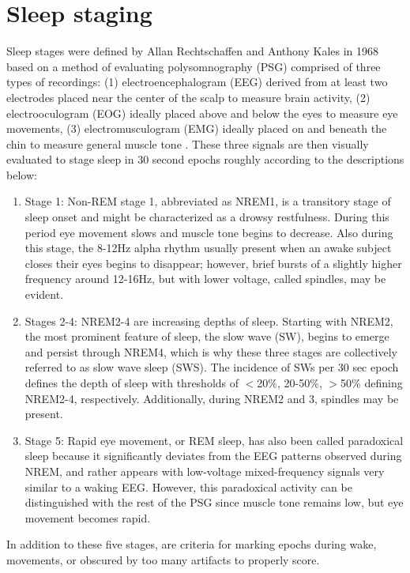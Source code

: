 \section*{Sleep staging}
Sleep stages were defined by Allan Rechtschaffen and Anthony Kales in 1968 based on a method of evaluating polysomnography (PSG) comprised of three types of recordings: (1) electroencephalogram (EEG) derived from at least two electrodes placed near the center of the scalp to measure brain activity, (2) electrooculogram (EOG) ideally placed above and below the eyes to measure eye movements, (3) electromusculogram (EMG) ideally placed on and beneath the chin to measure general muscle tone \cite{Kales1968}. These three signals are then visually evaluated to stage sleep in 30 second epochs roughly according to the descriptions below:
\begin{enumerate}
\item[] Stage 1: Non-REM stage 1, abbreviated as NREM1, is a transitory stage of sleep onset and might be characterized as a drowsy restfulness. During this period eye movement slows and muscle tone begins to decrease. Also during this stage, the 8-12Hz alpha rhythm usually present when an awake subject closes their eyes begins to disappear; however, brief bursts of a slightly higher frequency around 12-16Hz, but with lower voltage, called spindles, may be evident.
\item[] Stages 2-4: NREM2-4 are increasing depths of sleep. Starting with NREM2, the most prominent feature of sleep, the slow wave (SW), begins to emerge and persist through NREM4, which is why these three stages are collectively referred to as slow wave sleep (SWS). The incidence of SWs per 30 sec epoch defines the depth of sleep with thresholds of $<$20\%, 20-50\%, $>$50\% defining NREM2-4, respectively. Additionally, during NREM2 and 3, spindles may be present.
\item[] Stage 5: Rapid eye movement, or REM sleep, has also been called paradoxical sleep because it significantly deviates from the EEG patterns observed during NREM, and rather appears with low-voltage mixed-frequency signals very similar to a waking EEG. However, this paradoxical activity can be distinguished with the rest of the PSG since muscle tone remains low, but eye movement becomes rapid.
\end{enumerate}
In addition to these five stages, are criteria for marking epochs during wake, movements, or obscured by too many artifacts to properly score.

